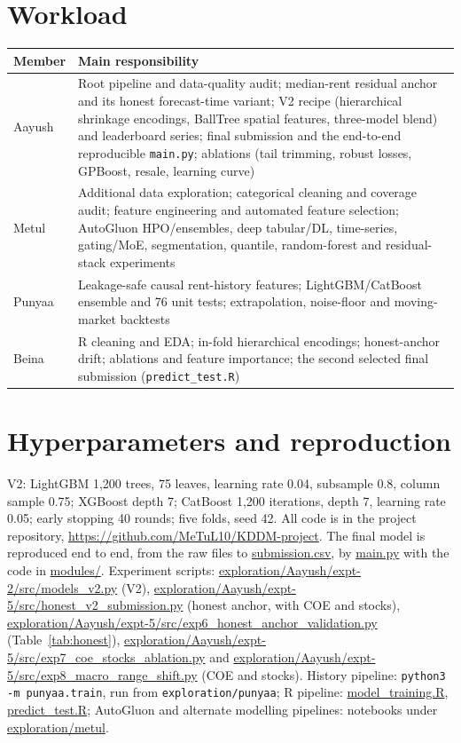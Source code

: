 \documentclass[conference]{IEEEtran}
\newif\ifshowsrc
\newcommand{\src}[1]{\ifshowsrc\textsuperscript{\tiny\color{gray}[#1]}\fi}
\begin{document}
\clearpage
\appendices
\section{Workload}\label{app:work}
\begin{table}[h]
\centering\footnotesize
\begin{tabular}{@{}lp{6.0cm}@{}}
\toprule
Member & Main responsibility\\
\midrule
Aayush & Root pipeline and data-quality audit; median-rent residual anchor and its honest forecast-time variant; V2 recipe (hierarchical shrinkage encodings, BallTree spatial features, three-model blend) and leaderboard series; final submission and the end-to-end reproducible \texttt{main.py}; ablations (tail trimming, robust losses, GPBoost, resale, learning curve)\\
Metul & Additional data exploration; categorical cleaning and coverage audit; feature engineering and automated feature selection; AutoGluon HPO/ensembles, deep tabular/DL, time-series, gating/MoE, segmentation, quantile, random-forest and residual-stack experiments\src{Wk-M}\\
Punyaa & Leakage-safe causal rent-history features; LightGBM/CatBoost ensemble and 76 unit tests; extrapolation, noise-floor and moving-market backtests\src{Wk-P}\\
Beina & R cleaning and EDA; in-fold hierarchical encodings; honest-anchor drift; ablations and feature importance; the second selected final submission (\texttt{predict\_test.R})\src{Wk-B}\\
\bottomrule
\end{tabular}
\end{table}

\section{Hyperparameters and reproduction}
{\raggedright V2: LightGBM 1,200 trees, 75 leaves, learning rate 0.04, subsample 0.8, column sample 0.75; XGBoost depth 7; CatBoost 1,200 iterations, depth 7, learning rate 0.05; early stopping 40 rounds; five folds, seed 42.\src{Aa-v2hp} All code is in the project repository, \url{https://github.com/MeTuL10/KDDM-project}. The final model is reproduced end to end, from the raw files to \url{submission.csv}, by \url{main.py} with the code in \url{modules/}.\src{Aa-main} Experiment scripts: \url{exploration/Aayush/expt-2/src/models_v2.py} (V2), \url{exploration/Aayush/expt-5/src/honest_v2_submission.py} (honest anchor, with COE and stocks), \url{exploration/Aayush/expt-5/src/exp6_honest_anchor_validation.py} (Table~\ref{tab:honest}), \url{exploration/Aayush/expt-5/src/exp7_coe_stocks_ablation.py} and \url{exploration/Aayush/expt-5/src/exp8_macro_range_shift.py} (COE and stocks). History pipeline: \texttt{python3 -m punyaa.train}, run from \texttt{exploration/punyaa}; R pipeline: \url{model_training.R}, \url{predict_test.R}; AutoGluon and alternate modelling pipelines: notebooks under \url{exploration/metul}.\src{Pu-repro,Be-scripts,Me-trace}\par}
\end{document}
